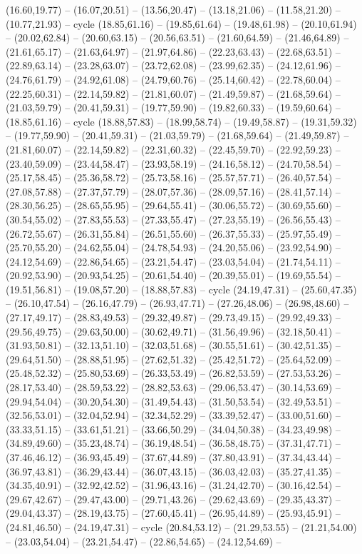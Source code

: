 {(16.60,19.77) -- (16.07,20.51) -- (13.56,20.47) -- (13.18,21.06) -- (11.58,21.20) -- (10.77,21.93) -- cycle (18.85,61.16) -- (19.85,61.64) -- (19.48,61.98) -- (20.10,61.94) -- (20.02,62.84) -- (20.60,63.15) -- (20.56,63.51) -- (21.60,64.59) -- (21.46,64.89) -- (21.61,65.17) -- (21.63,64.97) -- (21.97,64.86) -- (22.23,63.43) -- (22.68,63.51) -- (22.89,63.14) -- (23.28,63.07) -- (23.72,62.08) -- (23.99,62.35) -- (24.12,61.96) -- (24.76,61.79) -- (24.92,61.08) -- (24.79,60.76) -- (25.14,60.42) -- (22.78,60.04) -- (22.25,60.31) -- (22.14,59.82) -- (21.81,60.07) -- (21.49,59.87) -- (21.68,59.64) -- (21.03,59.79) -- (20.41,59.31) -- (19.77,59.90) -- (19.82,60.33) -- (19.59,60.64) -- (18.85,61.16) -- cycle (18.88,57.83) -- (18.99,58.74) -- (19.49,58.87) -- (19.31,59.32) -- (19.77,59.90) -- (20.41,59.31) -- (21.03,59.79) -- (21.68,59.64) -- (21.49,59.87) -- (21.81,60.07) -- (22.14,59.82) -- (22.31,60.32) -- (22.45,59.70) -- (22.92,59.23) -- (23.40,59.09) -- (23.44,58.47) -- (23.93,58.19) -- (24.16,58.12) -- (24.70,58.54) -- (25.17,58.45) -- (25.36,58.72) -- (25.73,58.16) -- (25.57,57.71) -- (26.40,57.54) -- (27.08,57.88) -- (27.37,57.79) -- (28.07,57.36) -- (28.09,57.16) -- (28.41,57.14) -- (28.30,56.25) -- (28.65,55.95) -- (29.64,55.41) -- (30.06,55.72) -- (30.69,55.60) -- (30.54,55.02) -- (27.83,55.53) -- (27.33,55.47) -- (27.23,55.19) -- (26.56,55.43) -- (26.72,55.67) -- (26.31,55.84) -- (26.51,55.60) -- (26.37,55.33) -- (25.97,55.49) -- (25.70,55.20) -- (24.62,55.04) -- (24.78,54.93) -- (24.20,55.06) -- (23.92,54.90) -- (24.12,54.69) -- (22.86,54.65) -- (23.21,54.47) -- (23.03,54.04) -- (21.74,54.11) -- (20.92,53.90) -- (20.93,54.25) -- (20.61,54.40) -- (20.39,55.01) -- (19.69,55.54) -- (19.51,56.81) -- (19.08,57.20) -- (18.88,57.83) -- cycle (24.19,47.31) -- (25.60,47.35) -- (26.10,47.54) -- (26.16,47.79) -- (26.93,47.71) -- (27.26,48.06) -- (26.98,48.60) -- (27.17,49.17) -- (28.83,49.53) -- (29.32,49.87) -- (29.73,49.15) -- (29.92,49.33) -- (29.56,49.75) -- (29.63,50.00) -- (30.62,49.71) -- (31.56,49.96) -- (32.18,50.41) -- (31.93,50.81) -- (32.13,51.10) -- (32.03,51.68) -- (30.55,51.61) -- (30.42,51.35) -- (29.64,51.50) -- (28.88,51.95) -- (27.62,51.32) -- (25.42,51.72) -- (25.64,52.09) -- (25.48,52.32) -- (25.80,53.69) -- (26.33,53.49) -- (26.82,53.59) -- (27.53,53.26) -- (28.17,53.40) -- (28.59,53.22) -- (28.82,53.63) -- (29.06,53.47) -- (30.14,53.69) -- (29.94,54.04) -- (30.20,54.30) -- (31.49,54.43) -- (31.50,53.54) -- (32.49,53.51) -- (32.56,53.01) -- (32.04,52.94) -- (32.34,52.29) -- (33.39,52.47) -- (33.00,51.60) -- (33.33,51.15) -- (33.61,51.21) -- (33.66,50.29) -- (34.04,50.38) -- (34.23,49.98) -- (34.89,49.60) -- (35.23,48.74) -- (36.19,48.54) -- (36.58,48.75) -- (37.31,47.71) -- (37.46,46.12) -- (36.93,45.49) -- (37.67,44.89) -- (37.80,43.91) -- (37.34,43.44) -- (36.97,43.81) -- (36.29,43.44) -- (36.07,43.15) -- (36.03,42.03) -- (35.27,41.35) -- (34.35,40.91) -- (32.92,42.52) -- (31.96,43.16) -- (31.24,42.70) -- (30.16,42.54) -- (29.67,42.67) -- (29.47,43.00) -- (29.71,43.26) -- (29.62,43.69) -- (29.35,43.37) -- (29.04,43.37) -- (28.19,43.75) -- (27.60,45.41) -- (26.95,44.89) -- (25.93,45.91) -- (24.81,46.50) -- (24.19,47.31) -- cycle (20.84,53.12) -- (21.29,53.55) -- (21.21,54.00) -- (23.03,54.04) -- (23.21,54.47) -- (22.86,54.65) -- (24.12,54.69) -- }
